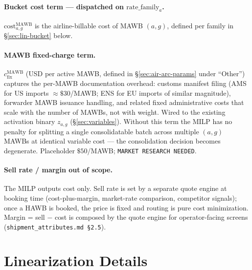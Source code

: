 \documentclass[11pt,a4paper]{article}
\theoremstyle{definition}
\begin{document}
\paragraph{Bucket cost term --- dispatched on $\text{rate\_family}_a$.}
$\text{cost}^{\text{MAWB}}_{a,g}$ is the airline-billable cost of MAWB
$(a, g)$, defined per family in \S\ref{sec:lin-bucket} below.

\paragraph{MAWB fixed-charge term.}
$c^{\text{MAWB}}_{\text{fix}}$ (USD per active MAWB, defined in
\S\ref{sec:air-arc-params} under ``Other'') captures the per-MAWB documentation
overhead: customs manifest filing (AMS for US imports $\approx \$30$/MAWB; ENS
for EU imports of similar magnitude), forwarder MAWB issuance handling, and
related fixed administrative costs that scale with the number of MAWBs, not
with weight. Wired to the existing activation binary $z_{a,g}$
(\S\ref{sec:variables}). Without this term the MILP has no penalty for
splitting a single consolidatable batch across multiple $(a, g)$ MAWBs at
identical variable cost --- the consolidation decision becomes degenerate.
Placeholder $\$50$/MAWB; \texttt{MARKET RESEARCH NEEDED}.

\paragraph{Sell rate / margin out of scope.}
The MILP outputs cost only. Sell rate is set by a separate quote engine at
booking time (cost-plus-margin, market-rate comparison, competitor signals);
once a HAWB is booked, the price is fixed and routing is pure cost
minimization. Margin = sell $-$ cost is composed by the quote engine for
operator-facing screens (\texttt{shipment\_attributes.md \S2.5}).

\section{Linearization Details}
\label{sec:linearization}
\end{document}
